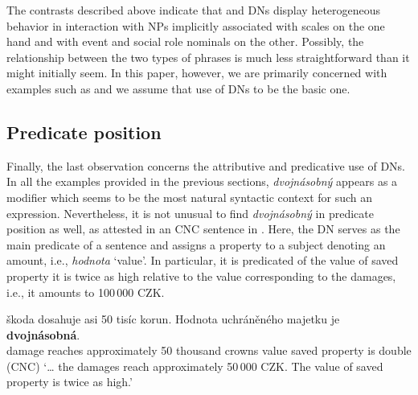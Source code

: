 \documentclass[output=paper,modfonts,hidelinks,newtxmath
\ChapterDOI{10.5281/zenodo.2545513}
]{langscibook}
\begin{document}
\ea\label{dvojnasobny-asymmetry} 
\z \z

\noindent The contrasts described above indicate that  and  DNs display heterogeneous behavior in interaction with NPs implicitly associated with scales on the one hand and with event and social role nominals on the other. Possibly, the relationship between the two types of phrases is much less straightforward than it might initially seem. In this paper, however, we are primarily concerned with examples such as  and we assume that use of  DNs to be the basic one.

\subsection{Predicate position}\label{predicate-position}

Finally, the last observation concerns the attributive and predicative use of  DNs. In all the examples provided in the previous sections, \textit{dvojnásobný} appears as a  modifier which seems to be the most natural syntactic context for such an expression. Nevertheless, it is not unusual to find \textit{dvojnásobný} in predicate position as well, as attested in an CNC sentence in . Here, the DN serves as the main predicate of a sentence and assigns a property to a subject denoting an amount, i.e., \textit{hodnota} `value'. In particular, it is predicated of the value of saved property it is twice as high relative to the value corresponding to the damages, i.e., it amounts to {100\,000 CZK}.

\ea \gll {\dots} škoda dosahuje asi 50 tisíc korun. Hodnota uchráněného majetku je \textbf{dvojnásobná}.\label{dvojnasobny-predicate}\\
{} damage reaches approximately 50 thousand crowns value saved property is double\\\hfill(CNC)
\glt `{\dots} the damages reach approximately 50\,000 CZK. The value of saved property is twice as high.'
\z
\end{document}
